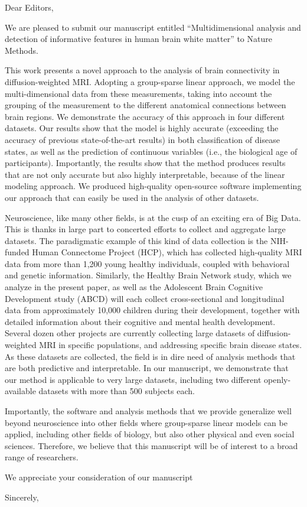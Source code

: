 \documentclass{letter}
\begin{document}
\begin{letter}{}
\opening{Dear Editors,}

We are pleased to submit our manuscript entitled ``Multidimensional analysis
and detection of informative features in human brain white matter'' to Nature
Methods.

This work presents a novel approach to the analysis of brain connectivity in
diffusion-weighted MRI. Adopting a group-sparse linear approach, we model the
multi-dimensional data from these measurements, taking into account the
grouping of the measurement to the different anatomical connections between
brain regions. We demonstrate the accuracy of this approach in four different
datasets. Our results show that the model is highly accurate (exceeding the
accuracy of previous state-of-the-art results) in both classification of
disease states, as well as the prediction of continuous variables (i.e., the
biological age of participants). Importantly, the results show that the
method produces results that are not only accurate but also highly
interpretable, because of the linear modeling approach. We produced
high-quality open-source software implementing our approach that can easily
be used in the analysis of other datasets.

Neuroscience, like many other fields, is at the cusp of an exciting era of
Big Data. This is thanks in large part to concerted efforts to collect and
aggregate large datasets. The paradigmatic example of this kind of data
collection is the NIH-funded Human Connectome Project (HCP), which has
collected high-quality MRI data from more than 1,200 young healthy
individuals, coupled with behavioral and genetic information. Similarly, the
Healthy Brain Network study, which we analyze in the present paper, as well
as the Adolescent Brain Cognitive Development study (ABCD) will each collect
cross-sectional and longitudinal data from approximately 10,000 children
during their development, together with detailed information about their
cognitive and mental health development. Several dozen other projects are
currently collecting large datasets of diffusion-weighted MRI in specific
populations, and addressing specific brain disease states. As these datasets
are collected, the field is in dire need of analysis methods that are both
predictive and interpretable. In our manuscript, we demonstrate that our
method is applicable to very large datasets, including two different
openly-available datasets with more than 500 subjects each.

Importantly, the software and analysis methods that we provide generalize
well beyond neuroscience into other fields where group-sparse linear models
can be applied, including other fields of biology, but also other physical
and even social sciences. Therefore, we believe that this manuscript will be
of interest to a broad range of researchers.

We appreciate your consideration of our manuscript

\closing{Sincerely,}


\end{letter}
\end{document}
